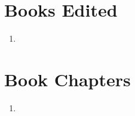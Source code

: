 \section*{Books Edited}

\begin{enumerate}
    \item {}
\end{enumerate}

\section*{Book Chapters}



\begin{enumerate}
    \item {}
\end{enumerate}


